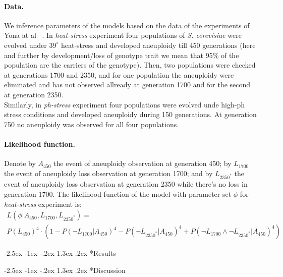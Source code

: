 \documentclass[12pt]{extarticle}
\makeatletter
\renewcommand\section{\@startsection {section}{1}{\z@}%
     {-2.5ex \@plus -1ex \@minus -.2ex}%
     {1.3ex \@plus.2ex}%
    {\Large\bfseries}}
\makeatother
\begin{document}
\paragraph{Data.} We inference parameters of the models based on the data of the experiments of Yona at al ~\cite{Yona2012}. In \emph{heat-stress} experiment four populations of \emph{S. cerevisiae} were evolved under $39^{\circ}$ heat-stress and developed aneuploidy till 450 generations (here and further by development/loss of genotype trait we mean that 95\% of the population are the carriers of the genotype). Then, two populations were checked at generations 1700 and 2350, and for one population the aneuploidy were eliminated and has not observed allready at generation 1700 and for the second at generation 2350. \\
Similarly, in \emph{ph-stress} experiment four populations were evolved unde high-ph stress conditions and developed aneuploidy during 150 generations. At generation 750 no aneuploidy was observed for all four populations. 

\paragraph{Likelihood function.}
 Denote by $A_{450}$ the event of aneuploidy observation at generation 450; by $L_{1700}$ the event of aneuploidy loss observation at generation 1700; and by $L_{2350^*}$ the event of aneuploidy loss observation at generation 2350 while there's no loss in generation 1700. The likelihood function of the model with parameter set $\phi$ for \emph{heat-stress} experiment is:
 \begin{multline} \label{eq:heatstress-likelihood}
L(\phi | A_{450}, L_{1700}, L_{2350^*} ) = \\
P(L_{450})^4 \cdot (1 - P(\lnot{L_{1700}} | A_{450} )^4 - P(\lnot{L_{2350^*}}| A_{450})^4 + P(\lnot{L_{1700}} \land \lnot{L_{2350^*}}| A_{450})^4 )		
 \end{multline}

 
 
\pagebreak
\section*{Results}

\pagebreak
\section*{Discussion}
\end{document}
